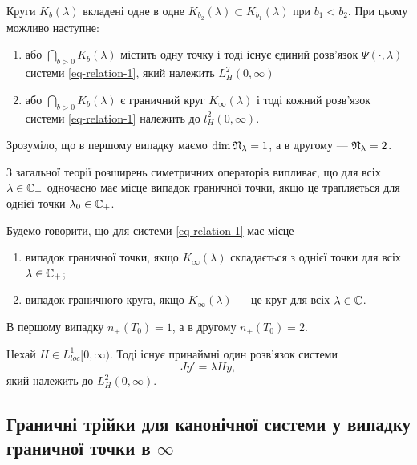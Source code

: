 \begin{corollary}
	Круги $K_b(\lambda)$ вкладені одне в одне $K_{b_2}(\lambda)\subset K_{b_1}(\lambda)$ при $b_1<b_2$.
	При цьому можливо наступне:
	\begin{enumerate}
		\item або $\bigcap\limits_{b>0} K_b(\lambda)$ містить одну точку і тоді існує єдиний розв'язок $\Psi(\cdot,\lambda)$ системи \eqref{eq-relation-1}, який належить $L_H^2(0,\infty)$
		\item або $\bigcap\limits_{b>0} K_b(\lambda)$ є граничний круг $K_\infty(\lambda)$ і тоді кожний розв'язок системи \eqref{eq-relation-1} належить до $l^2_H(0,\infty)$.
	\end{enumerate}
\end{corollary}

Зрозуміло, що в першому випадку маємо $\dim \mathfrak{N}_\lambda = 1$, а в другому --- $\mathfrak{N}_\lambda = 2$.

З загальної теорії розширень симетричних операторів випливає, що для всіх $\lambda\in\mathbb{C}_+$ одночасно має місце випадок граничної точки, якщо це трапляється для однієї точки $\lambda_0\in\mathbb{C}_+$.

\begin{definition}\label{def-4.5}
	Будемо говорити, що для системи \eqref{eq-relation-1} має місце
	\begin{enumerate}
		\item випадок граничної точки, якщо $K_\infty(\lambda)$ складається з однієї точки для всіх $\lambda\in\mathbb{C}_+$;
		\item випадок граничного круга, якщо $K_\infty(\lambda)$ --- це круг для всіх $\lambda\in\mathbb{C}$.
	\end{enumerate}
\end{definition}
В першому випадку $n_\pm(T_0) = 1$, а в другому $n_\pm(T_0) = 2$.

\begin{corollary} 
	Нехай $H\in L_{loc}^1[0,\infty)$. Тоді існує принаймні один розв'язок системи
	\begin{equation*}
		Jy'=\lambda Hy,
	\end{equation*}
	який належить до $L^2_H(0,\infty)$.
\end{corollary}

\subsection{Граничні трійки для канонічної системи у випадку граничної точки в $\infty$}

